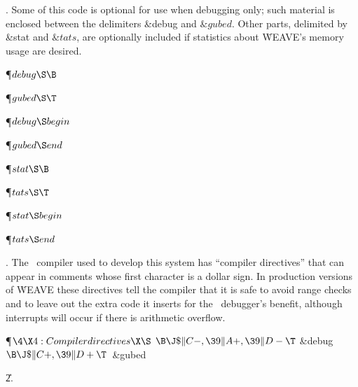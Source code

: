 . Some of this code is optional for use when debugging only;
such material is enclosed between the delimiters  \&{debug}  and $  \&{gubed}
$.
Other parts, delimited by  \&{stat}  and $  \&{tats} $, are optionally included
if statistics about \.{WEAVE}'s memory usage are desired.

\Y\P\D {}$\\{debug}\S\B$\par
\P\D {}$\\{gubed}\S\hbox{}\T$\par
\P\F {}$\\{debug}\S\\{begin}$\par
\P\F {}$\\{gubed}\S\\{end}$\Y\par
\P\D {}$\\{stat}\S\B$\par
\P\D {}$\\{tats}\S\hbox{}\T$\par
\P\F {}$\\{stat}\S\\{begin}$\par
\P\F {}$\\{tats}\S\\{end}$\par
\fi

. The \PASCAL\ compiler used to develop this system has ``compiler
directives'' that can appear in comments whose first character is a dollar
sign.
In production versions of \.{WEAVE} these directives tell the compiler that
it is safe to avoid range checks and to leave out the extra code it inserts
for the \PASCAL\ debugger's benefit, although interrupts will occur if
there is arithmetic overflow.

\Y\P$\4\X4:Compiler directives\X\S$\6
$\B\J\$\|C-,\39\|A+,\39\|D-\T$\6
\&{debug} $\B\J\$\|C+,\39\|D+\T$\ \&{gubed}\par
\U2\*.\fi

